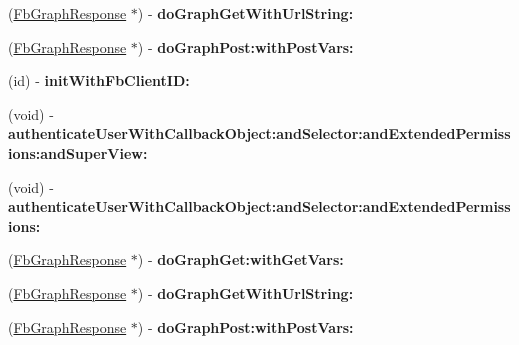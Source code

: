 \begin{DoxyCompactItemize}
\item 
\hypertarget{interface_fb_graph_ab40685f4804b7cf54eead42829ba406e}{
(\hyperlink{interface_fb_graph_response}{\-Fb\-Graph\-Response} $\ast$) -\/ {\bfseries do\-Graph\-Get\-With\-Url\-String\-:}}
\label{interface_fb_graph_ab40685f4804b7cf54eead42829ba406e}

\item 
\hypertarget{interface_fb_graph_a2a8d5f375485e446458fba832fe03c81}{
(\hyperlink{interface_fb_graph_response}{\-Fb\-Graph\-Response} $\ast$) -\/ {\bfseries do\-Graph\-Post\-:with\-Post\-Vars\-:}}
\label{interface_fb_graph_a2a8d5f375485e446458fba832fe03c81}

\item 
\hypertarget{interface_fb_graph_afd510d4c2b40e9c3057829c3a44d46dc}{
(id) -\/ {\bfseries init\-With\-Fb\-Client\-I\-D\-:}}
\label{interface_fb_graph_afd510d4c2b40e9c3057829c3a44d46dc}

\item 
\hypertarget{interface_fb_graph_a1bc31d022ed142e48addf23d40119a02}{
(void) -\/ {\bfseries authenticate\-User\-With\-Callback\-Object\-:and\-Selector\-:and\-Extended\-Permissions\-:and\-Super\-View\-:}}
\label{interface_fb_graph_a1bc31d022ed142e48addf23d40119a02}

\item 
\hypertarget{interface_fb_graph_af67e03ac3dfd34b8cb954cfcf633595a}{
(void) -\/ {\bfseries authenticate\-User\-With\-Callback\-Object\-:and\-Selector\-:and\-Extended\-Permissions\-:}}
\label{interface_fb_graph_af67e03ac3dfd34b8cb954cfcf633595a}

\item 
\hypertarget{interface_fb_graph_aa17e4cf632e883ccce808d0afce0f396}{
(\hyperlink{interface_fb_graph_response}{\-Fb\-Graph\-Response} $\ast$) -\/ {\bfseries do\-Graph\-Get\-:with\-Get\-Vars\-:}}
\label{interface_fb_graph_aa17e4cf632e883ccce808d0afce0f396}

\item 
\hypertarget{interface_fb_graph_ab40685f4804b7cf54eead42829ba406e}{
(\hyperlink{interface_fb_graph_response}{\-Fb\-Graph\-Response} $\ast$) -\/ {\bfseries do\-Graph\-Get\-With\-Url\-String\-:}}
\label{interface_fb_graph_ab40685f4804b7cf54eead42829ba406e}

\item 
\hypertarget{interface_fb_graph_a2a8d5f375485e446458fba832fe03c81}{
(\hyperlink{interface_fb_graph_response}{\-Fb\-Graph\-Response} $\ast$) -\/ {\bfseries do\-Graph\-Post\-:with\-Post\-Vars\-:}}
\label{interface_fb_graph_a2a8d5f375485e446458fba832fe03c81}


\end{DoxyCompactItemize}
